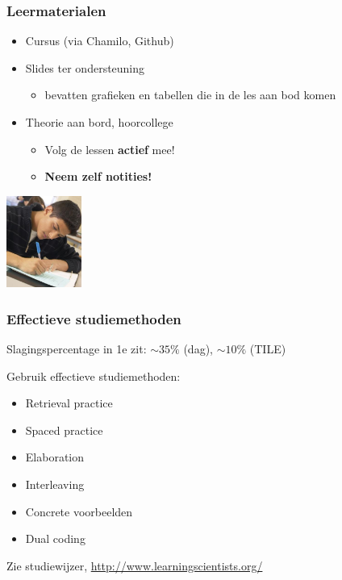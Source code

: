 \documentclass{beamer}
\begin{document}
\begin{frame}
  \frametitle{Leermaterialen}

  \begin{itemize}
    \item Cursus (via Chamilo, Github)
    \item Slides ter ondersteuning
      \begin{itemize}
        \item bevatten grafieken en tabellen die in de les aan bod komen
      \end{itemize}
    \item Theorie aan bord, hoorcollege
      \begin{itemize}
        \item Volg de lessen \textbf{actief} mee!
        \item \textbf{Neem zelf notities!}
      \end{itemize}
  \end{itemize}


  \begin{center}
    \includegraphics[height=3cm]{img/intro-06.jpg}
  \end{center}

\end{frame}

\begin{frame}
  \frametitle{Effectieve studiemethoden}
  
  Slagingspercentage in 1e zit: $\sim35\%$ (dag), $\sim10\%$ (TILE)
  
  \vspace{18pt}
  
  Gebruik effectieve studiemethoden:
  
  \begin{itemize}
    \item Retrieval practice
    \item Spaced practice
    \item Elaboration
    \item Interleaving
    \item Concrete voorbeelden
    \item Dual coding
  \end{itemize}

  Zie studiewijzer, \url{http://www.learningscientists.org/}
  
\end{frame}
\end{document}
